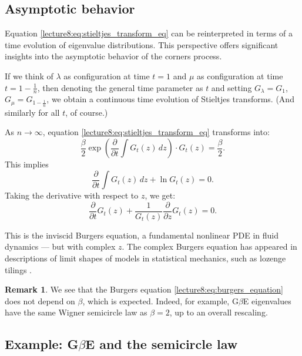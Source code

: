 \documentclass[letterpaper,11pt,oneside,reqno]{book}
\numberwithin{equation}{chapter}  %
\theoremstyle{definition}
\newtheorem{remark}[proposition]{Remark}
\begin{document}
\subsection{Asymptotic behavior}

Equation \eqref{lecture8:eq:stieltjes_transform_eq} can be reinterpreted in terms of a time evolution of eigenvalue distributions. This perspective offers significant insights into the asymptotic behavior of the corners process.

If we think of $\lambda$ as configuration at time $t=1$ and $\mu$ as configuration at time $t=1-\frac{1}{n}$, then denoting the general time parameter as $t$ and setting $G_\lambda = G_1$, $G_\mu = G_{1-\frac{1}{n}}$, we obtain a continuous time evolution of Stieltjes transforms.
(And similarly for all $t$, of course.)

As $n \to \infty$, equation \eqref{lecture8:eq:stieltjes_transform_eq} transforms into:
\begin{equation*}
\frac{\beta}{2} \exp\left(\frac{\partial}{\partial t}\int G_t(z)\,dz\right) \cdot G_t(z) = \frac{\beta}{2}.
\end{equation*}
This implies
\begin{equation*}
\frac{\partial}{\partial t}\int G_t(z)\,dz + \ln G_t(z) = 0.
\end{equation*}
Taking the derivative with respect to $z$, we get:
\begin{equation}
\label{lecture8:eq:burgers_equation}
\frac{\partial}{\partial t}G_t(z) + \frac{1}{G_t(z)}\frac{\partial}{\partial z}G_t(z) = 0.
\end{equation}

This is the inviscid Burgers equation, a
fundamental nonlinear PDE in fluid dynamics --- but with complex $z$.
The complex Burgers equation has appeared in descriptions of
limit shapes of models in statistical mechanics, such as lozenge tilings
\cite{OkounkovKenyon2007Limit}.

\begin{remark}
	We see that the Burgers equation \eqref{lecture8:eq:burgers_equation} does not depend on $\beta$,
	which is expected. Indeed, for example, G$\beta$E eigenvalues
	have the same Wigner semicircle law as $\beta=2$, up to an overall
	rescaling.
\end{remark}

\subsection{Example: G\texorpdfstring{\(\beta\)}{beta}E and the semicircle law}
\end{document}
